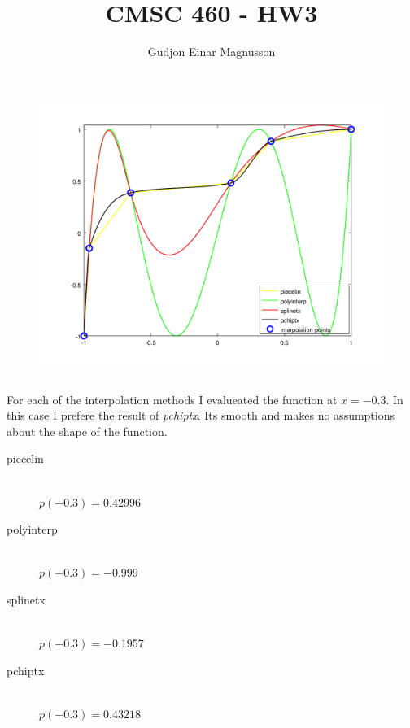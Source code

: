 \documentclass[12pt]{article}
\begin{document}
\title{CMSC 460 - HW3}
\author{Gudjon Einar Magnusson}

\maketitle

\section{} %

\subsection{}

\begin{figure}
    \includegraphics[width=\linewidth]{interp_plot}
    \centering
    \label{fig_interp_plot}

\end{figure}

\subsection{}

For each of the interpolation methods I evalueated the function at $x = -0.3$. In this case I prefere the result of \textit{pchiptx}. Its smooth and makes no assumptions about the shape of the function.
\begin{description}
    \item[piecelin] \hfill \\
    $p(-0.3) = 0.42996$
    \item[polyinterp] \hfill \\
    $p(-0.3) = -0.999$
    \item[splinetx] \hfill \\
    $p(-0.3) = -0.1957$
    \item[pchiptx] \hfill \\
    $p(-0.3) = 0.43218$
\end{description}

\subsection{}


\section{} %

\section{} %
\end{document}
